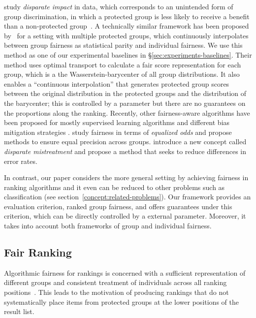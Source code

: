 \citet{Feldman2015} study \emph{disparate impact} in data, which corresponds to an unintended form of group discrimination, in which a protected group is less likely to receive a benefit than a non-protected group~\cite{Barocas2014}.
%
A technically similar framework has been proposed by~\citet{zehlike2020matching} for a setting with multiple protected groups, which continuously interpolates between group fairness as statistical parity and individual fairness.
%
We use this method as one of our experimental baselines in \S\ref{sec:experiments-baselines}.
%
Their method uses optimal transport to calculate a fair score representation for each group, which is a the Wasserstein-barycenter of all group distributions.
%
It also enables a ``continuous interpolation'' that generates protected group scores between the original distribution in the protected groups and the distribution of the barycenter; this is controlled by a parameter but there are no guarantees on the proportions along the ranking.
%
Recently, other fairness-aware algorithms have been proposed for mostly supervised learning algorithms and different bias mitigation strategies \cite{hardt2016equality, jabbari2016fair, friedler2016possibility, celis2016fair, corbett2017algorithmic}.
%
\citet{hardt2016equality} study fairness in terms of \emph{equalized odds} and propose methods to ensure equal precision across groups.
%
\citet{zafar2017fairness} introduce a new concept called \emph{disparate mistreatment} and propose a method that seeks to reduce differences in error rates.

In contrast, our paper considers the more general setting by achieving fairness in ranking algorithms and it even can be reduced to other problems such as classification (see section~\ref{concept:related-problems}). Our framework provides an evaluation criterion, ranked group fairness, and offers guarantees under this criterion, which can be directly controlled by a external parameter. Moreover, it takes into account both frameworks of group and individual fairness.

\subsection{Fair Ranking}
%
Algorithmic fairness for rankings is concerned with a sufficient representation of different groups and consistent treatment of individuals across all ranking positions~\cite{castillo2018fairness}.
%
This leads to the motivation of producing rankings that do not systematically place items from protected groups at the lower positions of the result list.

